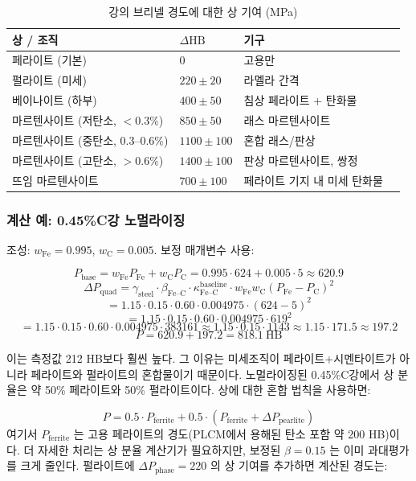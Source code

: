 \documentclass[12pt,a4paper]{article}
\begin{document}
	\begin{longtable}{p{3.5cm} p{3.0cm} p{3.0cm} p{4cm}}
		\caption{강의 브리넬 경도에 대한 상 기여 (MPa)}\label{tab:steel_phase_contrib}\\
		\toprule
		\textbf{상 / 조직} & $\Delta\text{HB}$ & \textbf{기구} \\
		\midrule
		페라이트 (기본) & 0 & 고용만 \\
		펄라이트 (미세) & $220 \pm 20$ & 라멜라 간격 \\
		베이나이트 (하부) & $400 \pm 50$ & 침상 페라이트 + 탄화물 \\
		마르텐사이트 (저탄소, $<0.3\%$) & $850 \pm 50$ & 래스 마르텐사이트 \\
		마르텐사이트 (중탄소, 0.3–0.6\%) & $1100 \pm 100$ & 혼합 래스/판상 \\
		마르텐사이트 (고탄소, $>0.6\%$) & $1400 \pm 100$ & 판상 마르텐사이트, 쌍정 \\
		뜨임 마르텐사이트 & $700 \pm 100$ & 페라이트 기지 내 미세 탄화물 \\
		\bottomrule
	\end{longtable}
	
	\subsubsection{계산 예: 0.45\%C강 노멀라이징}
	
	조성: $w_{\text{Fe}} = 0.995$, $w_{\text{C}} = 0.005$. 보정 매개변수 사용:
	
	\[
	P_{\text{base}} = w_{\text{Fe}} P_{\text{Fe}} + w_{\text{C}} P_{\text{C}} = 0.995\cdot624 + 0.005\cdot5 \approx 620.9
	\]
	\[
	\Delta P_{\text{quad}} = \gamma_{\text{steel}} \cdot \beta_{\text{Fe–C}} \cdot \kappa_{\text{Fe–C}}^{\text{baseline}} \cdot w_{\text{Fe}} w_{\text{C}} (P_{\text{Fe}}-P_{\text{C}})^2
	\]
	\[
	= 1.15 \cdot 0.15 \cdot 0.60 \cdot 0.004975 \cdot (624-5)^2
	\]
	\[
	= 1.15 \cdot 0.15 \cdot 0.60 \cdot 0.004975 \cdot 619^2
	\]
	\[
	= 1.15 \cdot 0.15 \cdot 0.60 \cdot 0.004975 \cdot 383161 \approx 1.15 \cdot 0.15 \cdot 1143 \approx 1.15 \cdot 171.5 \approx 197.2
	\]
	\[
	P = 620.9 + 197.2 = 818.1\ \text{HB}
	\]
	
	이는 측정값 212 HB보다 훨씬 높다. 그 이유는 미세조직이 페라이트+시멘타이트가 아니라 페라이트와 펄라이트의 혼합물이기 때문이다. 노멀라이징된 0.45\%C강에서 상 분율은 약 50\% 페라이트와 50\% 펄라이트이다. 상에 대한 혼합 법칙을 사용하면:
	
	\[
	P = 0.5 \cdot P_{\text{ferrite}} + 0.5 \cdot (P_{\text{ferrite}} + \Delta P_{\text{pearlite}})
	\]
	여기서 $P_{\text{ferrite}}$ 는 고용 페라이트의 경도(PLCM에서 용해된 탄소 포함 약 200 HB)이다. 더 자세한 처리는 상 분율 계산기가 필요하지만, 보정된 $\beta = 0.15$ 는 이미 과대평가를 크게 줄인다. 펄라이트에 $\Delta P_{\text{phase}} = 220$ 의 상 기여를 추가하면 계산된 경도는:
	
\end{document}
